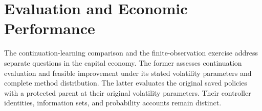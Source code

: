 \section{Evaluation and Economic Performance}\label{sec:r15evidence}
The continuation-learning comparison and the finite-observation exercise
address separate questions in the capital economy. The former assesses
continuation evaluation and feasible improvement under its stated volatility
parameters and complete method distribution. The latter evaluates the original
saved policies with a protected parent at their original volatility parameters.
Their controller identities, information sets, and probability accounts remain
distinct.










